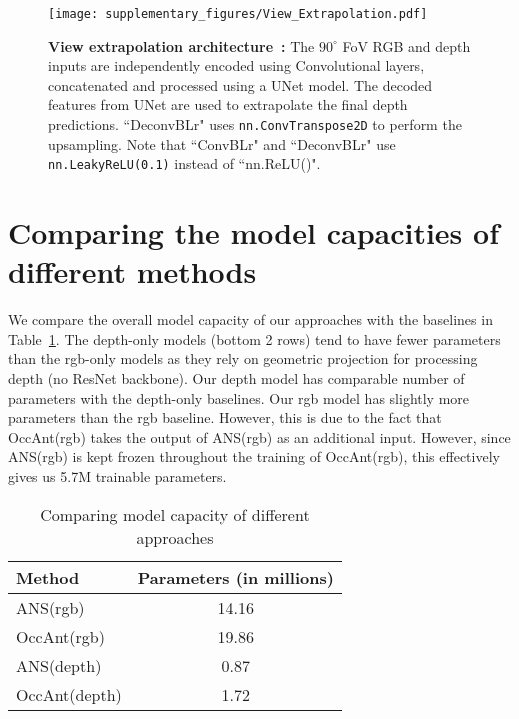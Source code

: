 \documentclass[runningheads]{llncs}
\newcommand{\code}[1]{\texttt{\small #1}}
\begin{document}
\begin{figure}[ht!]
    \centering
    \texttt{[image: supplementary\_figures/View\_Extrapolation.pdf]}
    \caption{\small \textbf{View extrapolation architecture~\cite{Yang_2019_CVPR}:} The $90^\circ$ FoV RGB and depth inputs are independently encoded using Convolutional layers, concatenated and processed using a UNet model. The decoded features from UNet are used to extrapolate the final depth predictions. ``DeconvBLr" uses \code{nn.ConvTranspose2D} to perform the upsampling. Note that ``ConvBLr" and ``DeconvBLr" use \code{nn.LeakyReLU(0.1)} instead of ``nn.ReLU()". }
    \label{fig:view_extrapolation_architecture}
\end{figure}


\section{Comparing the model capacities of different methods}
\label{sec:model_capacity_comparison}

We compare the overall model capacity of our approaches with the baselines in Table~\ref{tab:model_capacity_comparison}. The depth-only models (bottom 2 rows) tend to have fewer parameters than the rgb-only models as they rely on geometric projection for processing depth (no ResNet backbone). Our depth model has comparable number of parameters with the depth-only baselines. Our rgb model has slightly more parameters than the rgb baseline. However, this is due to the fact that OccAnt(rgb) takes the output of ANS(rgb) as an additional input. However, since ANS(rgb) is kept frozen throughout the training of OccAnt(rgb), this effectively gives us 5.7M trainable parameters. 

\begin{table}[!]
    \centering
    \begin{tabular}{@{}lc@{}}
    \toprule
    Method        & Parameters (in millions) \\ \midrule
    ANS(rgb)      & 14.16                   \\
    OccAnt(rgb)   & 19.86                   \\ \midrule
    ANS(depth)    & 0.87                    \\
    OccAnt(depth) & 1.72                    \\\bottomrule
    \end{tabular}
    \caption{Comparing model capacity of different approaches}
    \label{tab:model_capacity_comparison}
\end{table}
\end{document}
